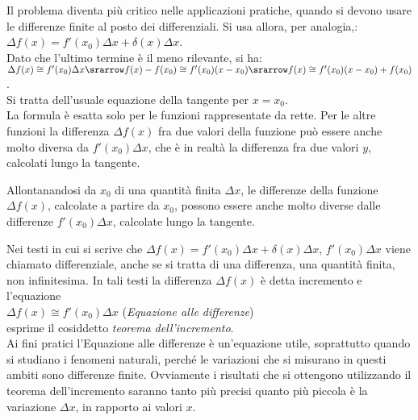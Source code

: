Il problema diventa più critico nelle applicazioni pratiche, quando si devono 
usare le differenze finite al posto dei differenziali. Si usa allora, per
analogia,:\\
$\Delta f(x)=f'(x_0)\Delta x + \delta(x)\Delta x$.\\
Dato che l'ultimo termine è il meno rilevante, si ha:\\
$\Delta f(x)\cong f'(x_0)\Delta x \srarrow
f(x)-f(x_0)\cong f'(x_0)(x-x_0)\srarrow f(x)\cong f'(x_0)(x-x_0)+ f(x_0)$.\\
Si tratta dell'usuale equazione della tangente per $x=x_0$.\\
La formula è esatta solo per le funzioni rappresentate da rette.
Per le altre funzioni la differenza $\Delta f(x)$ fra due valori della funzione 
può essere anche molto diversa da $f'(x_0)\Delta x$, che è in realtà la 
differenza fra due valori $y$, calcolati lungo la tangente.

\begin{inaccessibleblock}
  \begin{minipage}[]{.4\textwidth}
    \begin{center} \falsodifferenziale \end{center}
 \end{minipage} 
  \hfill
 \begin{minipage}[]{.55\textwidth}
 Allontanandosi da $x_0$ di una quantità finita $\Delta x$, le differenze della
 funzione $\Delta f(x)$, calcolate a partire da $x_0$, possono 
 essere anche molto diverse dalle differenze $f'(x_0)\Delta x$, calcolate lungo
 la tangente.
 \end{minipage}
\end{inaccessibleblock}
\label{}

Nei testi in cui si scrive che $\Delta f(x)=f'(x_0)\Delta x+\delta(x)\Delta x$,
$f'(x_0)\Delta x$ viene chiamato differenziale, anche se si tratta di una differenza,
una quantità finita, non infinitesima. In tali testi la differenza $\Delta f(x)$ è detta 
incremento e l'equazione\\
$\Delta f(x)\cong f'(x_0)\Delta x$ \hspace{.5cm}(\emph{Equazione alle differenze})\\ 
esprime il cosiddetto \emph{teorema dell'incremento}.\\
Ai fini pratici l'Equazione alle differenze è un'equazione utile, soprattutto 
quando si studiano i fenomeni naturali, perché le variazioni che si misurano in
questi ambiti sono differenze finite. 
Ovviamente i risultati che si ottengono utilizzando il teorema dell'incremento
saranno tanto più precisi quanto più piccola è la variazione $\Delta x$, in 
rapporto ai valori $x$.

